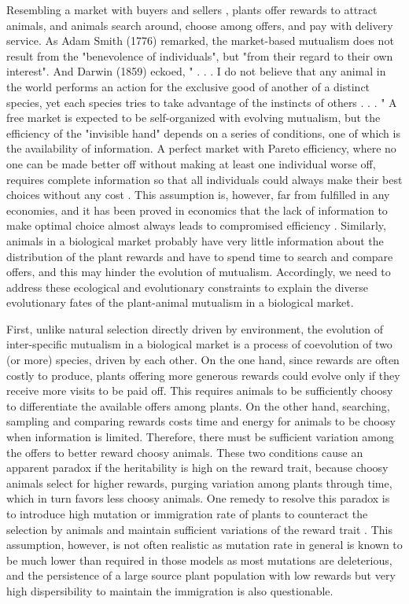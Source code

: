 \documentclass[12pt]{article}
\begin{document}
Resembling a market with buyers and sellers \citep{Noe.Hammerstein1994}, plants offer rewards to attract animals, and animals search around, choose among offers, and pay with delivery service. As Adam Smith (1776) remarked, the market-based mutualism does not result from the "benevolence of individuals", but "from their regard to their own interest". And Darwin (1859) eckoed, " . . . I do not believe that any animal in the world performs an action for the exclusive good of another of a distinct species, yet each species tries to take advantage of the instincts of others . . . " A free market is expected to be self-organized with evolving mutualism, but the efficiency of the "invisible hand" depends on a series of conditions, one of which is the availability of information. A perfect market with Pareto efficiency, where no one can be made better off without making at least one individual worse off, requires complete information so that all individuals could always make their best choices without any cost \citep{Arrow1954}. This assumption is, however, far from fulfilled in any economies, and it has been proved in economics that the lack of information to make optimal choice almost always leads to compromised efficiency \citep{Greenwald1986}. Similarly, animals in a biological market probably have very little information about the distribution of the plant rewards and have to spend time to search and compare offers, and this may hinder the evolution of mutualism. Accordingly, we need to address these ecological and evolutionary constraints to explain the diverse evolutionary fates of the plant-animal mutualism in a biological market.

First, unlike natural selection directly driven by environment, the evolution of inter-specific mutualism in a biological market is a process of coevolution of two (or more) species, driven by each other. On the one hand, since rewards are often costly to produce, plants offering more generous rewards could evolve only if they receive more visits to be paid off. This requires animals to be sufficiently choosy to differentiate the available offers among plants. On the other hand, searching, sampling and comparing rewards costs time and energy for animals to be choosy when information is limited. Therefore, there must be sufficient variation among the offers to better reward choosy animals. These two conditions cause an apparent paradox if the heritability is high on the reward trait, because choosy animals select for higher rewards, purging variation among plants through time, which in turn favors less choosy animals. One remedy to resolve this paradox is to introduce high mutation or immigration rate of plants to counteract the selection by animals and maintain sufficient variations of the reward trait \citep{Foster.Kokko2006, McNamara.etal2008}. This assumption, however, is not often realistic as mutation rate in general is known to be much lower than required in those models as most mutations are deleterious, and the persistence of a large source plant population with low rewards but very high dispersibility to maintain the immigration is also questionable.
\end{document}
